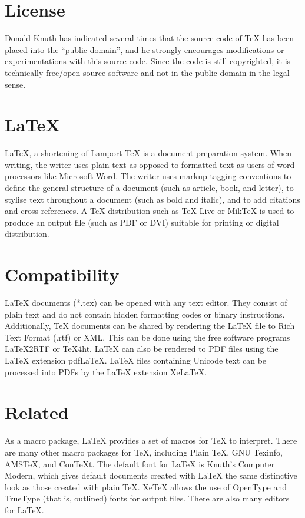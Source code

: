 \documentclass[oneside]{book}
\begin{document}
\section{License}
Donald Knuth has indicated several times that the source code of TeX has
been placed into the ``public domain'', and he strongly encourages
modifications or experimentations with this source code. Since the code
is still copyrighted, it is technically free/open-source software and
not in the public domain in the legal sense.

\section{LaTeX}
\LaTeX{}, a shortening of Lamport \TeX{} is a document preparation
system. When writing, the writer uses plain text as opposed to
formatted text as users of word processors like Microsoft Word. The
writer uses markup tagging conventions to define the general structure
of a document (such as article, book, and letter), to stylise text
throughout a document (such as bold and italic), and to add citations
and cross-references. A \TeX{} distribution such as \TeX{} Live or
MikTeX is used to produce an output file (such as PDF or DVI) suitable
for printing or digital distribution.

\section{Compatibility}
\LaTeX{} documents (*.tex) can be opened with any text editor. They
consist of plain text and do not contain hidden formatting codes or
binary instructions. Additionally, \TeX{} documents can be shared by
rendering the \LaTeX{} file to Rich Text Format (.rtf) or XML. This can
be done using the free software programs LaTeX2RTF or TeX4ht. \LaTeX{}
can also be rendered to PDF files using the \LaTeX{} extension pdfLaTeX.
\LaTeX{} files containing Unicode text can be processed into PDFs by the
\LaTeX{} extension XeLaTeX.

\section{Related}
As a macro package, \LaTeX{} provides a set of macros for \TeX{} to
interpret. There are many other macro packages for \TeX{}, including
Plain \TeX{}, GNU Texinfo, AMSTeX, and ConTeXt. The default font for
\LaTeX{} is Knuth's Computer Modern, which gives default documents
created with \LaTeX{} the same distinctive look as those created with
plain \TeX{}. XeTeX allows the use of OpenType and TrueType (that is,
outlined) fonts for output files. There are also many editors for
\LaTeX{}.
\end{document}
